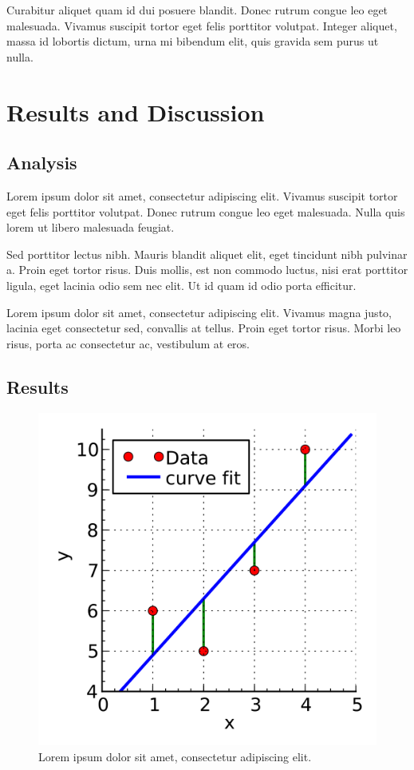 \documentclass[12pt,twocolumn]{article}
\begin{document}
Curabitur aliquet quam id dui posuere blandit. Donec rutrum congue leo eget malesuada. Vivamus suscipit tortor eget felis porttitor volutpat. Integer aliquet, massa id lobortis dictum, urna mi bibendum elit, quis gravida sem purus ut nulla.

\section{Results and Discussion}

\subsection{Analysis}

Lorem ipsum dolor sit amet, consectetur adipiscing elit. Vivamus suscipit tortor eget felis porttitor volutpat. Donec rutrum congue leo eget malesuada. Nulla quis lorem ut libero malesuada feugiat. \citet{vaswani2017attention}

Sed porttitor lectus nibh. Mauris blandit aliquet elit, eget tincidunt nibh pulvinar a. Proin eget tortor risus. Duis mollis, est non commodo luctus, nisi erat porttitor ligula, eget lacinia odio sem nec elit. Ut id quam id odio porta efficitur.

Lorem ipsum dolor sit amet, consectetur adipiscing elit. Vivamus magna justo, lacinia eget consectetur sed, convallis at tellus. Proin eget tortor risus. Morbi leo risus, porta ac consectetur ac, vestibulum at eros.


\subsection{Results}

\begin{figure}[h]
  \centering
  \includegraphics[width=0.7\linewidth]{images/example1.png} %
  \caption{Lorem ipsum dolor sit amet, consectetur adipiscing elit.}
  \label{fig:example}
\end{figure}
\end{document}
